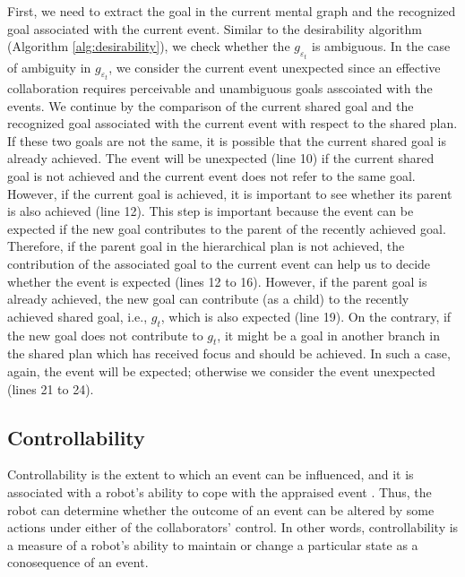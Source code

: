 \documentclass[letterpaper]{article}
\begin{document}
First, we need to extract the goal in the current mental graph and the
recognized goal associated with the current event. Similar to the desirability
algorithm (Algorithm \ref{alg:desirability}), we check whether the
$\mathit{g}_{\varepsilon_t}$ is ambiguous. In the case of ambiguity in
$\mathit{g}_{\varepsilon_t}$, we consider the current event unexpected since an
effective collaboration requires perceivable and unambiguous goals asscoiated
with the events. We continue by the comparison of the current shared goal and
the recognized goal associated with the current event with respect to the shared
plan. If these two goals are not the same, it is possible that the current
shared goal is already achieved. The event will be unexpected (line 10) if the
current shared goal is not achieved and the current event does not refer to the
same goal. However, if the current goal is achieved, it is important to see
whether its parent is also achieved (line 12). This step is important because
the event can be expected if the new goal contributes to the parent of the
recently achieved goal. Therefore, if the parent goal in the hierarchical plan
is not achieved, the contribution of the associated goal to the current event
can help us to decide whether the event is expected (lines 12 to 16). However,
if the parent goal is already achieved, the new goal can contribute (as a child)
to the recently achieved shared goal, i.e., $\mathit{g}_{t}$, which is also
expected (line 19). On the contrary, if the new goal does not contribute to
$\mathit{g}_{t}$, it might be a goal in another branch in the shared plan which
has received focus and should be achieved. In such a case, again, the event will
be expected; otherwise we consider the event unexpected (lines 21 to 24).

\subsection{Controllability}

Controllability is the extent to which an event can be influenced, and it is
associated with a robot's ability to cope with the appraised event
\cite{gratch:domain-independent}. Thus, the robot can determine whether the
outcome of an event can be altered by some actions under either of the
collaborators' control. In other words, controllability is a measure of a
robot's ability to maintain or change a particular state as a conosequence of an
event.
\end{document}
